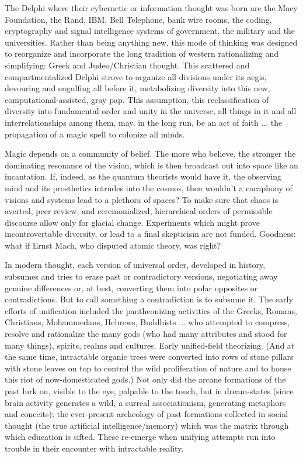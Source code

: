 \documentclass[11pt,twoside,draft]{memoir}
\begin{document}
The Delphi where their cybernetic or information thought was born are the Macy
Foundation, the Rand, IBM, Bell Telephone, bank wire rooms, the coding, cryptography
and signal intelligence systems of government,
the military and the universities.
Rather than being anything new, this mode
of thinking was designed to reorganize and
incorporate the long tradition of western
rationalizing and simplifying: Greek and
Judeo/Christian thought. This scattered and
compartmentalized Delphi strove to organize all divisions under its aegis, devouring
and engulfing all before it, metabolizing
diversity into this new, computational-assisted, gray pap. This assumption, this reclassification of diversity into fundamental order and unity in the universe, all things in
it and all interrelationships among them, may, in the long run, be an act of faith ... the
propagation of a magic spell to colonize all minds.

Magic depends on a community of belief.
The more who believe, the stronger the
dominating resonance of the vision, which
is then broadcast out into space like an
incantation. If, indeed, as the quantum
theorists would have it, the observing mind
and its prosthetics intrudes into the cosmos,
then wouldn't a cacaphony of visions and
systems lead to a plethora of spaces? To
make sure that chaos is averted, peer review,
and ceremonialized, hierarchical orders of
permissible discourse allow only for glacial
change. Experiments which might prove incontrovertable
diversity, or lead to a final
skepticism are not funded. Goodness: what
if Ernst Mach, who disputed atomic theory,
was right?

In modern thought, each version of universal order, developed in history, subsumes
and tries to erase past or contradictory versions, negotiating away genuine differences
or, at best, converting them into polar opposites or contradictions. But to call something
a contradiction is to subsume it. The early
efforts of unification included the pantheonizing activities of the Greeks, Romans,
Christians, Mohammedans, Hebrews, Buddhists ... who attempted to compress, resolve and rationalize the many gods (who had many attributes and stood for many things), spirits, realms and cultures. Early
unified-field theorizing. (And at the same time, intractable organic trees were converted
into rows of stone pillars with stone leaves on top to control the wild proliferation of
nature and to house this riot of now-domesticated gods.) Not only did the arcane formations of the past lurk on, visible to the eye,
palpable to the touch, but in dream-states (since brain activity generates a wild, a surreal associationism, generating metaphors and conceits); the ever-present archeology of
past formations collected in social thought (the true artificial intelligence/memory)
which was the matrix through which education is sifted. These re-emerge when unifying attempts run into trouble in their encounter with intractable reality.
\end{document}
